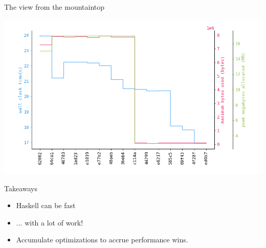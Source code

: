 \documentclass[8pt]{beamer}
\begin{document}
\begin{frame}[fragile]{The view from the mountaintop}

\includegraphics[height=0.6\textwidth]{./perfdata-gen.png}

\end{frame}


\begin{frame}[fragile]{Takeaways}
\pause
\begin{itemize}
\item Haskell can be fast \pause
\item ... with a lot of work! \pause
\item Accumulate optimizations to accrue performance wins. \pause
\end{itemize}
\end{frame}
\end{document}
